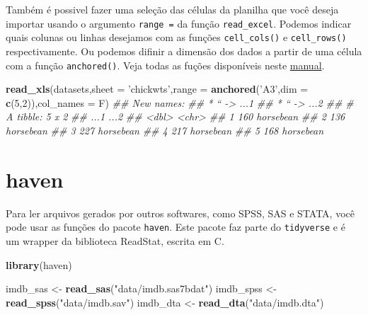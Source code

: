 \documentclass[
]{book}
\newenvironment{Shaded}{\begin{snugshade}}{\end{snugshade}}
\newcommand{\CommentTok}[1]{\textcolor[rgb]{0.56,0.35,0.01}{\textit{#1}}}
\newcommand{\DataTypeTok}[1]{\textcolor[rgb]{0.13,0.29,0.53}{#1}}
\newcommand{\DecValTok}[1]{\textcolor[rgb]{0.00,0.00,0.81}{#1}}
\newcommand{\KeywordTok}[1]{\textcolor[rgb]{0.13,0.29,0.53}{\textbf{#1}}}
\newcommand{\NormalTok}[1]{#1}
\newcommand{\StringTok}[1]{\textcolor[rgb]{0.31,0.60,0.02}{#1}}
\begin{document}
Também é possivel fazer uma seleção das células da planilha que você deseja importar usando o argumento \texttt{range\ =} da função \texttt{read\_excel}. Podemos indicar quais colunas ou linhas desejamos com as funções \texttt{cell\_cols()} e \texttt{cell\_rows()} respectivamente. Ou podemos difinir a dimensão dos dados a partir de uma célula com a função \texttt{anchored()}. Veja todas as fuções disponíveis neste \href{https://cran.r-project.org/web/packages/cellranger/cellranger.pdf}{manual}.

\begin{Shaded}
\begin{Highlighting}[]
\KeywordTok{read_xls}\NormalTok{(datasets,}\DataTypeTok{sheet =} \StringTok{'chickwts'}\NormalTok{,}\DataTypeTok{range =} \KeywordTok{anchored}\NormalTok{(}\StringTok{'A3'}\NormalTok{,}\DataTypeTok{dim =} \KeywordTok{c}\NormalTok{(}\DecValTok{5}\NormalTok{,}\DecValTok{2}\NormalTok{)),}\DataTypeTok{col_names =}\NormalTok{ F)}
\CommentTok{## New names:}
\CommentTok{## * `` -> ...1}
\CommentTok{## * `` -> ...2}
\CommentTok{## # A tibble: 5 x 2}
\CommentTok{##    ...1 ...2     }
\CommentTok{##   <dbl> <chr>    }
\CommentTok{## 1   160 horsebean}
\CommentTok{## 2   136 horsebean}
\CommentTok{## 3   227 horsebean}
\CommentTok{## 4   217 horsebean}
\CommentTok{## 5   168 horsebean}
\end{Highlighting}
\end{Shaded}

\hypertarget{haven}{%
\section{haven}\label{haven}}

Para ler arquivos gerados por outros softwares, como SPSS, SAS e STATA, você pode usar as funções do pacote \texttt{haven}. Este pacote faz parte do \texttt{tidyverse} e é um wrapper da biblioteca ReadStat, escrita em C.

\begin{Shaded}
\begin{Highlighting}[]
\KeywordTok{library}\NormalTok{(haven)}

\NormalTok{imdb_sas <-}\StringTok{ }\KeywordTok{read_sas}\NormalTok{(}\StringTok{"data/imdb.sas7bdat"}\NormalTok{)}
\NormalTok{imdb_spss <-}\StringTok{ }\KeywordTok{read_spss}\NormalTok{(}\StringTok{"data/imdb.sav"}\NormalTok{)}
\NormalTok{imdb_dta <-}\StringTok{ }\KeywordTok{read_dta}\NormalTok{(}\StringTok{"data/imdb.dta"}\NormalTok{)}
\end{Highlighting}
\end{Shaded}
\end{document}
